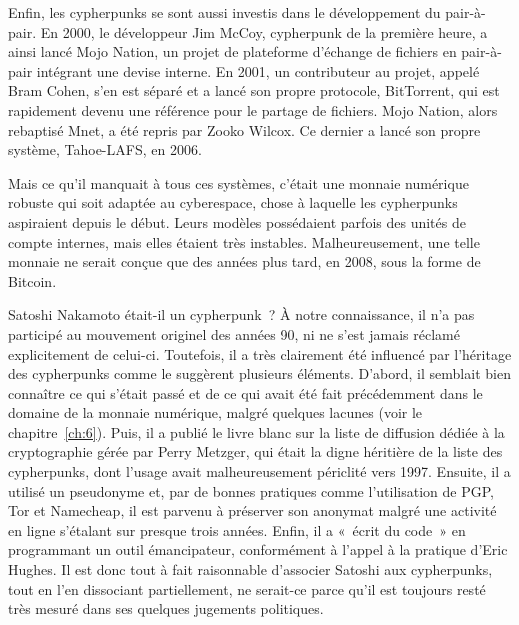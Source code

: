 Enfin, les cypherpunks se sont aussi investis dans le développement du pair-à-pair. En 2000, le développeur Jim McCoy, cypherpunk de la première heure, a ainsi lancé Mojo Nation, un projet de plateforme d'échange de fichiers en pair-à-pair intégrant une devise interne. En 2001, un contributeur au projet, appelé Bram Cohen, s'en est séparé et a lancé son propre protocole, BitTorrent, qui est rapidement devenu une référence pour le partage de fichiers. Mojo Nation, alors rebaptisé Mnet, a été repris par Zooko Wilcox. Ce dernier a lancé son propre système, Tahoe-LAFS, en 2006. %

Mais ce qu'il manquait à tous ces systèmes, c'était une monnaie numérique robuste qui soit adaptée au cyberespace, chose à laquelle les cypherpunks aspiraient depuis le début. Leurs modèles possédaient parfois des unités de compte internes, mais elles étaient très instables. Malheureusement, une telle monnaie ne serait conçue que des années plus tard, en 2008, sous la forme de Bitcoin.

Satoshi Nakamoto était-il un cypherpunk~? À notre connaissance, il n'a pas participé au mouvement originel des années 90, ni ne s'est jamais réclamé explicitement de celui-ci. Toutefois, il a très clairement été influencé par l'héritage des cypherpunks comme le suggèrent plusieurs éléments. D'abord, il semblait bien connaître ce qui s'était passé et de ce qui avait été fait précédemment dans le domaine de la monnaie numérique, malgré quelques lacunes (voir le chapitre~\ref{ch:6}). Puis, il a publié le livre blanc sur la liste de diffusion dédiée à la cryptographie gérée par Perry Metzger, qui était la digne héritière de la liste des cypherpunks, dont l'usage avait malheureusement périclité vers 1997. Ensuite, il a utilisé un pseudonyme et, par de bonnes pratiques comme l'utilisation de PGP, Tor et Namecheap, il est parvenu à préserver son anonymat malgré une activité en ligne s'étalant sur presque trois années. Enfin, il a «~écrit du code~» en programmant un outil émancipateur, conformément à l'appel à la pratique d'Eric Hughes. Il est donc tout à fait raisonnable d'associer Satoshi aux cypherpunks, tout en l'en dissociant partiellement, ne serait-ce parce qu'il est toujours resté très mesuré dans ses quelques jugements politiques.

